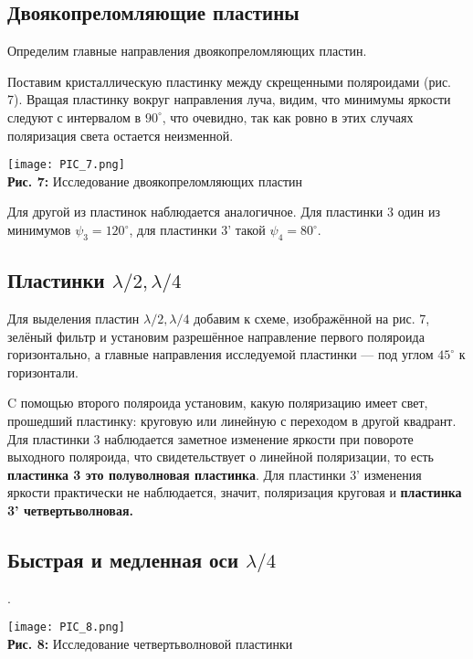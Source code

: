\documentclass[12pt,a4paper]{scrartcl}
\begin{document}
 	\subsection{Двоякопреломляющие пластины}
 	
 	Определим главные направления двоякопреломляющих пластин. 
 	
 	Поставим кристаллическую пластинку между скрещенными поляроидами (рис. 7). Вращая пластинку вокруг направления луча, видим, что минимумы яркости следуют с интервалом в $90^\circ$, что очевидно, так как ровно в этих случаях поляризация света остается неизменной.
 	
 	\begin{center}
 		\texttt{[image: PIC\_7.png]}
 		\\\textbf{Рис. 7:} Исследование двоякопреломляющих пластин
 	\end{center}
 	
 	Для другой из пластинок наблюдается аналогичное. Для пластинки 3 один из минимумов $\psi_3 = 120^\circ$, для пластинки 3' такой $\psi_4 = 80^\circ$.
 	
 	\subsection{Пластинки $ \lambda/2, \lambda/4 $}
 	
 	Для выделения пластин $ \lambda/2, \lambda/4 $ добавим к схеме, изображённой на рис. 7, зелёный фильтр и установим разрешённое направление первого поляроида горизонтально, а главные направления исследуемой пластинки --- под углом $ 45^\circ $ к горизонтали.
 	
 	C помощью второго поляроида установим, какую поляризацию
 	имеет свет, прошедший пластинку: круговую или линейную с переходом
 	в другой квадрант. Для пластинки 3 наблюдается заметное изменение яркости при повороте выходного поляроида, что свидетельствует о линейной поляризации, то есть \textbf{пластинка 3 это полуволновая пластинка}. Для пластинки 3' изменения яркости практически не наблюдается, значит, поляризация круговая и \textbf{пластинка 3' четвертьволновая.}
 	
 	\subsection{Быстрая и медленная оси $ \lambda/4 $}.
 	
 	 \begin{center}
 		\texttt{[image: PIC\_8.png]}
 		\\\textbf{Рис. 8:} Исследование четвертьволновой пластинки
 	\end{center}
 	
\end{document}
